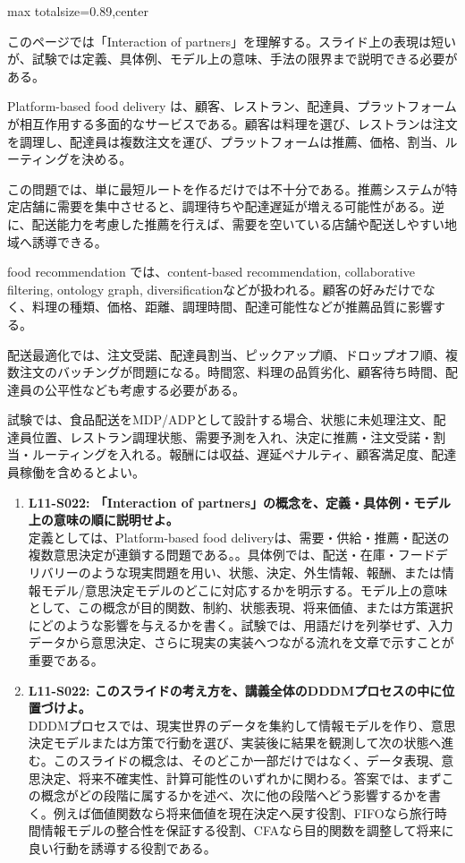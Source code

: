 \begin{minipage}[t]{0.58\textwidth}
\begin{adjustbox}{max totalsize={\textwidth}{0.89\textheight},center}
\begin{minipage}{\textwidth}\scriptsize
{}このページでは「Interaction of partners」を理解する。スライド上の表現は短いが、試験では定義、具体例、モデル上の意味、手法の限界まで説明できる必要がある。\par
Platform-based food delivery は、顧客、レストラン、配達員、プラットフォームが相互作用する多面的なサービスである。顧客は料理を選び、レストランは注文を調理し、配達員は複数注文を運び、プラットフォームは推薦、価格、割当、ルーティングを決める。\par
この問題では、単に最短ルートを作るだけでは不十分である。推薦システムが特定店舗に需要を集中させると、調理待ちや配達遅延が増える可能性がある。逆に、配送能力を考慮した推薦を行えば、需要を空いている店舗や配送しやすい地域へ誘導できる。\par
food recommendation では、content-based recommendation, collaborative filtering, ontology graph, diversificationなどが扱われる。顧客の好みだけでなく、料理の種類、価格、距離、調理時間、配達可能性などが推薦品質に影響する。\par
配送最適化では、注文受諾、配達員割当、ピックアップ順、ドロップオフ順、複数注文のバッチングが問題になる。時間窓、料理の品質劣化、顧客待ち時間、配達員の公平性なども考慮する必要がある。\par
試験では、食品配送をMDP/ADPとして設計する場合、状態に未処理注文、配達員位置、レストラン調理状態、需要予測を入れ、決定に推薦・注文受諾・割当・ルーティングを入れる。報酬には収益、遅延ペナルティ、顧客満足度、配達員稼働を含めるとよい。\par{}\begin{enumerate}\item \textbf{L11-S022: 「Interaction of partners」の概念を、定義・具体例・モデル上の意味の順に説明せよ。}\\定義としては、Platform-based food deliveryは、需要・供給・推薦・配送の複数意思決定が連鎖する問題である。。具体例では、配送・在庫・フードデリバリーのような現実問題を用い、状態、決定、外生情報、報酬、または情報モデル/意思決定モデルのどこに対応するかを明示する。モデル上の意味として、この概念が目的関数、制約、状態表現、将来価値、または方策選択にどのような影響を与えるかを書く。試験では、用語だけを列挙せず、入力データから意思決定、さらに現実の実装へつながる流れを文章で示すことが重要である。\item \textbf{L11-S022: このスライドの考え方を、講義全体のDDDMプロセスの中に位置づけよ。}\\DDDMプロセスでは、現実世界のデータを集約して情報モデルを作り、意思決定モデルまたは方策で行動を選び、実装後に結果を観測して次の状態へ進む。このスライドの概念は、そのどこか一部だけではなく、データ表現、意思決定、将来不確実性、計算可能性のいずれかに関わる。答案では、まずこの概念がどの段階に属するかを述べ、次に他の段階へどう影響するかを書く。例えば価値関数なら将来価値を現在決定へ戻す役割、FIFOなら旅行時間情報モデルの整合性を保証する役割、CFAなら目的関数を調整して将来に良い行動を誘導する役割である。\end{enumerate}

\end{minipage}
\end{adjustbox}
\end{minipage}
